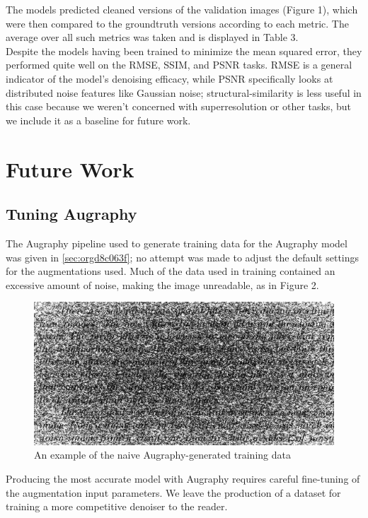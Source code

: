 \documentclass[runningheads]{article}
\begin{document}
The models predicted cleaned versions of the validation images (Figure 1), which were then compared to the groundtruth versions according to each metric. The average over all such metrics was taken and is displayed in Table 3.\\

Despite the models having been trained to minimize the mean squared error, they performed quite well on the RMSE, SSIM, and PSNR tasks. RMSE is a general indicator of the model's denoising efficacy, while PSNR specifically looks at distributed noise features like Gaussian noise; structural-similarity is less useful in this case because we weren't concerned with superresolution or other tasks, but we include it as a baseline for future work.\\

\section{Future Work}
\label{sec:orgc17a604}

\subsection{Tuning Augraphy}
\label{sec:orgede3362}
The Augraphy pipeline used to generate training data for the Augraphy model was given in \ref{sec:orgd8c063f}; no attempt was made to adjust the default settings for the augmentations used. Much of the data used in training contained an excessive amount of noise, making the image unreadable, as in Figure 2.

\begin{figure}[htbp]
\centering
\includegraphics[width=.9\linewidth]{./images/3-6-augraphy.png}
\caption{\label{fig:org5c6d5b6}An example of the naive Augraphy-generated training data}
\end{figure}

Producing the most accurate model with Augraphy requires careful fine-tuning of the augmentation input parameters. We leave the production of a dataset for training a more competitive denoiser to the reader.
\end{document}
